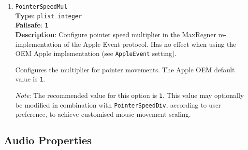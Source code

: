 \documentclass[]{article}
\makeatletter
\renewcommand{\label}[1]{%
\zref@wrapper@immediate{\oldlabel{#1}}}  %
\makeatother
\begin{document}
\begin{enumerate}
  Configures the divisor for pointer movements. The Apple OEM default value is \texttt{1}.
  \texttt{0} is an invalid value for this option.

  \emph{Note}: The recommended value for this option is \texttt{1}. This value may
  optionally be modified in combination with \texttt{PointerSpeedMul}, according to user
  preference, to achieve customised mouse movement scaling.

\item
  \texttt{PointerSpeedMul}\\
  \textbf{Type}: \texttt{plist\ integer}\\
  \textbf{Failsafe}: \texttt{1}\\
  \textbf{Description}: Configure pointer speed multiplier in the MaxRegner re-implementation
  of the Apple Event protocol.
  Has no effect when using the OEM Apple implementation (see \texttt{AppleEvent} setting).

  Configures the multiplier for pointer movements. The Apple OEM default value is \texttt{1}.

  \emph{Note}: The recommended value for this option is \texttt{1}. This value may
  optionally be modified in combination with \texttt{PointerSpeedDiv}, according to user
  preference, to achieve customised mouse movement scaling.

\end{enumerate}

\subsection{Audio Properties}\label{uefiaudioprops}
\end{document}
